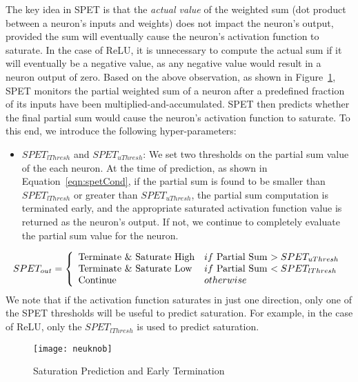 \documentclass{article} %
\begin{document}
The key idea in SPET is that the \emph{actual value} of the weighted sum (dot product between a neuron's inputs and weights) does not impact the neuron's output, provided the sum will eventually cause the neuron's activation function to saturate. In the case of ReLU, it is unnecessary to compute the actual sum if it will eventually be a negative value, as any negative value would result in a neuron output of zero. Based on the above observation, as shown in Figure~\ref{fig:neuknob}, SPET monitors the partial weighted sum of a neuron after a predefined fraction of its inputs have been multiplied-and-accumulated. SPET then predicts whether the final partial sum would cause the neuron's activation function to saturate. To this end, we introduce the following hyper-parameters:
\begin{itemize}
    \item $SPET_{lThresh}$ and $SPET_{uThresh}$: We set two thresholds on the partial sum value of the each neuron. At the time of prediction, as shown in Equation~\ref{eqn:spetCond}, if the partial sum is found to be smaller than $SPET_{lThresh}$ or greater than $SPET_{uThresh}$, the partial sum computation is terminated early, and the appropriate saturated activation function value is returned as the neuron's output. If not, we continue to completely evaluate the partial sum value for the neuron.
\end{itemize}
\begin{equation}
    SPET_{out} = \left \{
    \begin{array} {l  l}
    $Terminate \& Saturate High$ & if $ Partial Sum $ > SPET_{uThresh} \\
    $Terminate \& Saturate Low$ & if $ Partial Sum $ < SPET_{lThresh} \\
    $Continue$ & otherwise
    \end{array} \right.
\label{eqn:spetCond}
\end{equation}
We note that if the activation function saturates in just one direction, only one of the SPET thresholds will be useful to predict saturation. For example, in the case of ReLU, only the $SPET_{lThresh}$ is used to predict saturation.

\begin{figure}[htb]
\begin{center}
\texttt{[image: neuknob]}
\end{center}
\caption{Saturation Prediction and Early Termination}
\label{fig:neuknob}
\end{figure}
\end{document}
